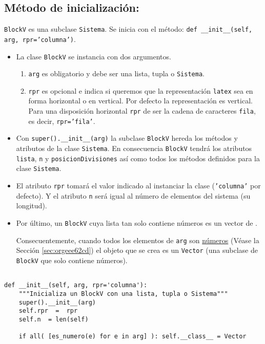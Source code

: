 \documentclass[11pt]{report}
\begin{document}
\subsection{Método de inicialización:}
\label{sec:org5e23b56}

\texttt{BlockV} es una subclase \texttt{Sistema}. Se inicia con el método: \texttt{def
\_\_init\_\_(self, arg, rpr='columna')}.

\begin{itemize}
\item La clase \texttt{BlockV} se instancia con dos argumentos. 

\begin{enumerate}
\item \texttt{arg} es obligatorio y debe ser una lista, tupla o \texttt{Sistema}.

\item \texttt{rpr} es opcional e indica si queremos que la representación
\texttt{latex} sea en forma horizontal o en vertical. Por defecto la
representación es vertical. Para una disposición horizontal \texttt{rpr}
de ser la cadena de caracteres \texttt{fila}, es decir, \texttt{rpr='fila'}.
\end{enumerate}

\item Con \texttt{super().\_\_init\_\_(arg)} la subclase \texttt{BlockV} hereda los métodos
y atributos de la clase \texttt{Sistema}. En consecuencia \texttt{BlockV} tendrá
los atributos \texttt{lista}, \texttt{n} y \texttt{posicionDivisiones} así como todos los
métodos definidos para la clase \texttt{Sistema}.

\item El atributo \texttt{rpr} tomará el valor indicado al instanciar la clase
(\texttt{'columna'} por defecto). Y el atributo \texttt{n} será igual al número de
elementos del sistema (su longitud).

\item Por último, un \texttt{BlockV} cuya lista tan solo contiene números es un
vector de \R[n].

Consecuentemente, cuando todos los elementos de \texttt{arg} son \hyperref[sec:orgeee62cd]{números}
(Véase la Sección \ref{sec:orgeee62cd}) el objeto que se crea es un \texttt{Vector} (una
subclase de \texttt{BlockV} que solo contiene números).
\end{itemize}


\begin{verbatim}

def __init__(self, arg, rpr='columna'):
    """Inicializa un BlockV con una lista, tupla o Sistema"""
    super().__init__(arg)
    self.rpr  =  rpr
    self.n  = len(self)
    
    if all( [es_numero(e) for e in arg] ): self.__class__ = Vector

\end{verbatim}
\end{document}
